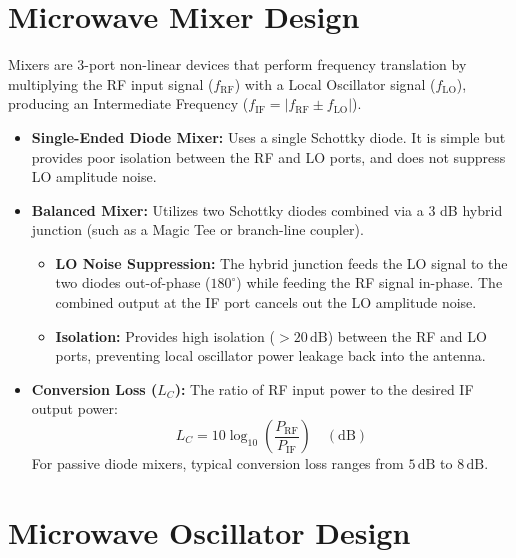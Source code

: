 \documentclass[12pt,a4paper]{article}
\begin{document}
\section{Microwave Mixer Design}

Mixers are 3-port non-linear devices that perform frequency translation by multiplying the RF input signal ($f_{\text{RF}}$) with a Local Oscillator signal ($f_{\text{LO}}$), producing an Intermediate Frequency ($f_{\text{IF}} = |f_{\text{RF}} \pm f_{\text{LO}}|$).
\begin{itemize}[leftmargin=*, itemsep=3pt]
  \item \textbf{Single-Ended Diode Mixer:} Uses a single Schottky diode. It is simple but provides poor isolation between the RF and LO ports, and does not suppress LO amplitude noise.
  \item \textbf{Balanced Mixer:} Utilizes two Schottky diodes combined via a 3 dB hybrid junction (such as a Magic Tee or branch-line coupler).
  \begin{itemize}[leftmargin=*, itemsep=2.5pt, topsep=0pt]
    \item \textbf{LO Noise Suppression:} The hybrid junction feeds the LO signal to the two diodes out-of-phase ($180^\circ$) while feeding the RF signal in-phase. The combined output at the IF port cancels out the LO amplitude noise.
    \item \textbf{Isolation:} Provides high isolation ($>20\,\text{dB}$) between the RF and LO ports, preventing local oscillator power leakage back into the antenna.
  \end{itemize}
  \item \textbf{Conversion Loss ($L_C$):} The ratio of RF input power to the desired IF output power:
    \begin{equation}
      L_C = 10 \log_{10}\left( \frac{P_{\text{RF}}}{P_{\text{IF}}} \right) \quad (\text{dB})
    \end{equation}
    For passive diode mixers, typical conversion loss ranges from $5\,\text{dB}$ to $8\,\text{dB}$.
\end{itemize}

\section{Microwave Oscillator Design}
\end{document}
